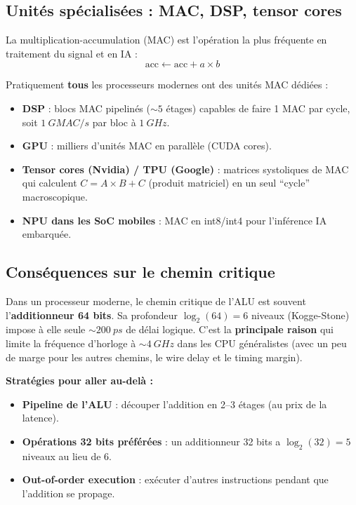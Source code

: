\documentclass[12pt,a4paper,twoside]{book}
\begin{document}
\subsection{Unités spécialisées : MAC, DSP, tensor cores}

\begin{formule}
La multiplication-accumulation (MAC) est l'opération la plus fréquente en traitement du signal et en IA :
\[
\boxed{\text{acc} \leftarrow \text{acc} + a \times b}
\]

Pratiquement \textbf{tous} les processeurs modernes ont des unités MAC dédiées :
\begin{itemize}[nosep]
\item \textbf{DSP} : blocs MAC pipelinés ($\sim 5$ étages) capables de faire 1 MAC par cycle, soit $\SI{1}{GMAC/s}$ par bloc à $\SI{1}{GHz}$.
\item \textbf{GPU} : milliers d'unités MAC en parallèle (CUDA cores).
\item \textbf{Tensor cores (Nvidia) / TPU (Google)} : matrices systoliques de MAC qui calculent $C = A \times B + C$ (produit matriciel) en un seul ``cycle'' macroscopique.
\item \textbf{NPU dans les SoC mobiles} : MAC en int8/int4 pour l'inférence IA embarquée.
\end{itemize}
\end{formule}

\subsection{Conséquences sur le chemin critique}

\begin{formule}
Dans un processeur moderne, le chemin critique de l'ALU est souvent l'\textbf{additionneur 64 bits}. Sa profondeur $\log_2(64) = 6$ niveaux (Kogge-Stone) impose à elle seule $\sim\SI{200}{ps}$ de délai logique. C'est la \textbf{principale raison} qui limite la fréquence d'horloge à $\sim\SI{4}{GHz}$ dans les CPU généralistes (avec un peu de marge pour les autres chemins, le wire delay et le timing margin).

\textbf{Stratégies pour aller au-delà :}
\begin{itemize}[nosep]
\item \textbf{Pipeline de l'ALU} : découper l'addition en 2--3 étages (au prix de la latence).
\item \textbf{Opérations 32 bits préférées} : un additionneur 32 bits a $\log_2(32) = 5$ niveaux au lieu de 6.
\item \textbf{Out-of-order execution} : exécuter d'autres instructions pendant que l'addition se propage.
\end{itemize}
\end{formule}
\end{document}
